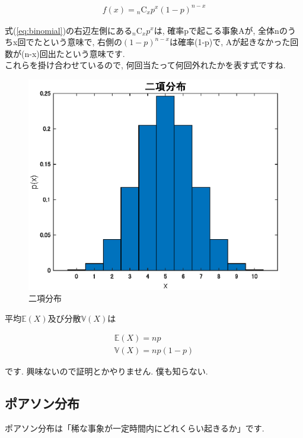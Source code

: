 \documentclass[11pt,a4paper]{ujreport} 	%
\begin{document}
\begin{align}
\label{eq:binomial}
f(x) = {}_n\mathrm{C}_x p^x(1-p)^{n-x}
\end{align}

式(\ref{eq:binomial})の右辺左側にある${}_n\mathrm{C}_x p^x$は, 確率pで起こる事象Aが, 全体nのうちx回でたという意味で, 右側の$(1-p)^{n-x}$は確率(1-p)で, Aが起きなかった回数が(n-x)回出たという意味です.\\

これらを掛け合わせているので, 何回当たって何回外れたかを表す式ですね.

\begin{figure}[H]
\label{im:bino}
  \centering
  \includegraphics[width=15cm]{../figures/binomial.eps}
  \caption{二項分布}
\end{figure}

平均$\mathbb{E}(X)$及び分散$\mathbb{V}(X)$は

\begin{align}
\mathbb{E}(X) = np\\
\mathbb{V}(X) = np(1-p)
\end{align}

です. 興味ないので証明とかやりません. 僕も知らない.

\subsection{ポアソン分布}
ポアソン分布は「稀な事象が一定時間内にどれくらい起きるか」です.\\
\end{document}
